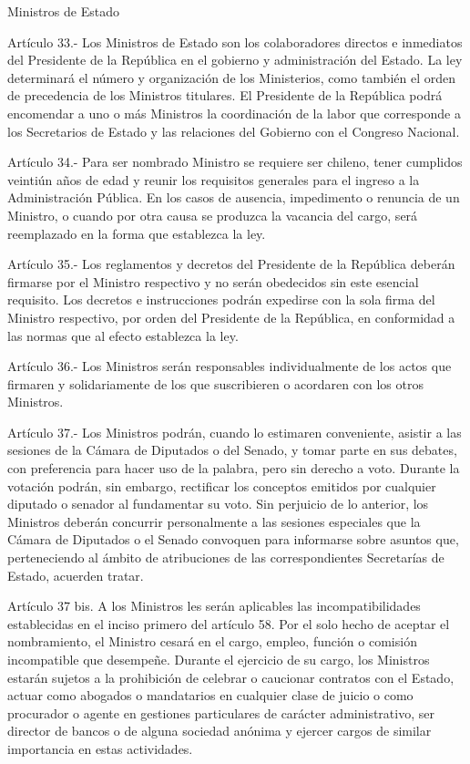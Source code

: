     Ministros de Estado



    Artículo 33.- Los Ministros de Estado son los colaboradores directos e inmediatos del Presidente de la República en el gobierno y administración del Estado.
    La ley determinará el número y organización de los Ministerios, como también el orden de precedencia de los Ministros titulares.
    El Presidente de la República podrá encomendar a uno o más Ministros la coordinación de la labor que corresponde a los Secretarios de Estado y las relaciones del Gobierno con el Congreso Nacional.



    Artículo 34.- Para ser nombrado Ministro se requiere ser chileno, tener cumplidos veintiún años de edad y reunir los requisitos generales para el ingreso a la Administración Pública.
    En los casos de ausencia, impedimento o renuncia de un Ministro, o cuando por otra causa se produzca la vacancia del cargo, será reemplazado en la forma que establezca la ley.



    Artículo 35.- Los reglamentos y decretos del Presidente de la República deberán firmarse por el Ministro respectivo y no serán obedecidos sin este esencial requisito.
    Los decretos e instrucciones podrán expedirse con la sola firma del Ministro respectivo, por orden del Presidente de la República, en conformidad a las normas que al efecto establezca la ley.



    Artículo 36.- Los Ministros serán responsables individualmente de los actos que firmaren y solidariamente de los que suscribieren o acordaren con los otros Ministros.


    Artículo 37.- Los Ministros podrán, cuando lo estimaren conveniente, asistir a las sesiones de la Cámara de Diputados o del Senado, y tomar parte en sus debates, con preferencia para hacer uso de la palabra, pero sin derecho a voto. Durante la votación podrán, sin embargo, rectificar los conceptos emitidos por cualquier diputado o senador al fundamentar su voto.
    Sin perjuicio de lo anterior, los Ministros deberán concurrir personalmente a las sesiones especiales que la Cámara de Diputados o el Senado convoquen para informarse sobre asuntos que, perteneciendo al ámbito de atribuciones de las correspondientes Secretarías de Estado, acuerden tratar.



    Artículo 37 bis. A los Ministros les serán aplicables las incompatibilidades establecidas en el inciso primero del artículo 58. Por el solo hecho de aceptar el nombramiento, el Ministro cesará en el cargo, empleo, función o comisión incompatible que desempeñe.
    Durante el ejercicio de su cargo, los Ministros estarán sujetos a la prohibición de celebrar o caucionar contratos con el Estado, actuar como abogados o mandatarios en cualquier clase de juicio o como procurador o agente en gestiones particulares de carácter administrativo, ser director de bancos o de alguna sociedad anónima y ejercer cargos de similar importancia en estas actividades.



